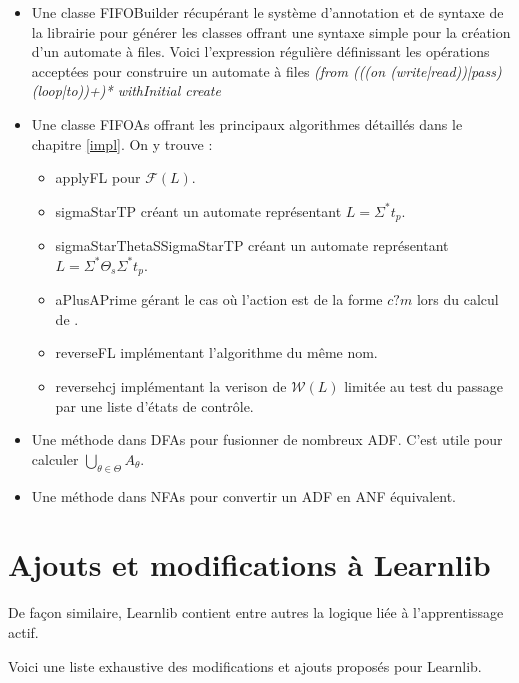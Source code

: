 \begin{itemize}
  \item Une classe FIFOBuilder récupérant le système d'annotation et de syntaxe de la librairie pour générer les classes offrant une syntaxe simple pour la création d'un automate à files. Voici l'expression régulière définissant les opérations acceptées pour construire un automate à files \emph{(from (((on (write|read))|pass) (loop|to))+)* withInitial create}
  \item Une classe FIFOAs offrant les principaux algorithmes détaillés dans le chapitre \ref{impl}. On y trouve :
    \begin{itemize}
      \item applyFL pour $\mathcal{F}(L)$.
      \item sigmaStarTP créant un automate représentant $L=\Sigma^*t_p$.
      \item sigmaStarThetaSSigmaStarTP créant un automate représentant $L=\Sigma^*\Theta_s\Sigma^*t_p$.
      \item aPlusAPrime gérant le cas où l'action est de la forme $c?m$ lors du calcul de \fl.
      \item reverseFL implémentant l'algorithme du même nom.
      \item reversehcj implémentant la verison de $\mathcal{W}(L)$ limitée au test du passage par une liste d'états de contrôle.
    \end{itemize}
  \item Une méthode dans DFAs pour fusionner de nombreux ADF. C'est utile pour calculer $\bigcup_{\theta\in\Theta}A_\theta$.
  \item Une méthode dans NFAs pour convertir un ADF en ANF équivalent.
\end{itemize}


\section{Ajouts et modifications à Learnlib}

De façon similaire, Learnlib contient entre autres la logique liée à l'apprentissage actif.

Voici une liste exhaustive des modifications et ajouts proposés pour Learnlib.


